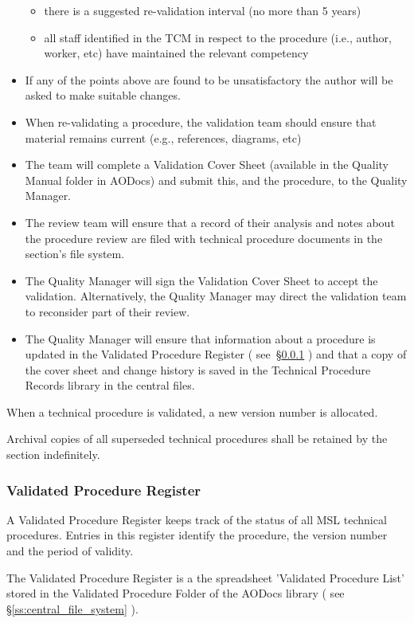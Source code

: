 \begin{itemize}
\begin{itemize}
\item there is a suggested re-validation interval (no more than 5 years)
\item all staff identified in the TCM in respect to the procedure (i.e., author, worker, etc) have maintained the relevant competency
\end{itemize}
\item If any of the points above are found to be unsatisfactory the author will be asked to make suitable changes.
\item When re-validating a procedure, the validation team should ensure that material remains current (e.g., references, diagrams, etc)
\item The team will complete a Validation Cover Sheet (available in the Quality Manual folder in AODocs) and submit this, and the procedure, to the Quality Manager. 
\item The review team will ensure that a record of their analysis and notes about the procedure review are filed with technical procedure documents in the section’s file system. 
\item The Quality Manager will sign the Validation Cover Sheet to accept the validation. Alternatively, the Quality Manager may direct the validation team to reconsider part of their review.
\item The Quality Manager will ensure that information about a procedure is updated in the Validated Procedure Register ( see~\S\ref{sss:validated_procedure_register} ) and that a copy of the cover sheet and change history is saved in the Technical Procedure Records library in the central files.
\end{itemize}

When a technical procedure is validated, a new version number is allocated. 

Archival copies of all superseded technical procedures shall be retained by the section indefinitely.

\subsubsection{Validated Procedure Register}
\label{sss:validated_procedure_register}
A Validated Procedure Register keeps track of the status of all MSL technical procedures. Entries in this register identify the procedure, the version number and the period of validity.

The Validated Procedure Register is a the spreadsheet 'Validated Procedure List' stored in the Validated Procedure Folder of the AODocs library ( see \S\ref{ss:central_file_system} ). 

